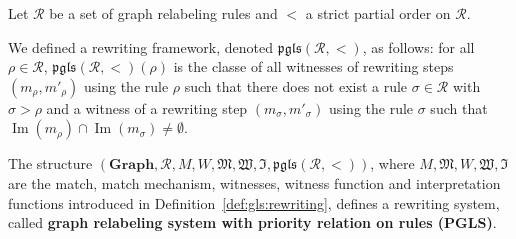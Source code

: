     \begin{definition}
      \label{def:pgls_framework}
    
      Let $\mathcal{R}$ be a set of graph relabeling rules and $<$ a strict partial order on $\mathcal{R}$.
    
      We defined a rewriting framework, denoted $\mathfrak{pgls}(\mathcal{R},<)$, as follows: for all $\rho \mathop{\in} \mathcal{R}$,
      $\mathfrak{pgls}(\mathcal{R},<)(\rho)$ is the classe of all witnesses of rewriting steps
      $\left(  m_\rho, m'_\rho \right)$ using the rule $\rho$
      such that there does not exist 
      a rule $\sigma \mathop{\in} \mathcal{R}$ with $\sigma \mathop{>} \rho$ and a witness of a rewriting step
      $\left(  m_\sigma, m'_\sigma \right)$ using the rule $\sigma$ such that 
      $\operatorname{Im}(m_\rho) \mathop{\cap} \operatorname{Im}(m_\sigma) \mathop{\neq} \emptyset$.
 
      The structure $(\mathbf{Graph},\mathcal{R},M,W,\mathfrak{M},\mathfrak{W},\mathfrak{I}, \mathfrak{pgls}(\mathcal{R},<))$, where $M, \mathfrak{M}, W , \mathfrak{W}, \mathfrak{I}$ are the match, match mechanism, witnesses, witness function and interpretation functions introduced in Definition~\ref{def:gls:rewriting}, defines a rewriting system, called \textbf{graph relabeling system with priority relation on rules (PGLS)}. 

    \end{definition}
     

